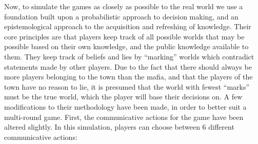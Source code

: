 Now, to simulate the games as closely as possible to the real world we use a 
foundation built upon a probabilistic approach to decision making, and an 
epistemological approach to the acquisition and refreshing of 
knowledge\cite{commitment}.
Their core principles are that players keep track of all possible worlds that
may be possible based on their own knowledge, and the public knowledge
available to them. They keep track of beliefs and lies by “marking” worlds
which contradict statements made by other players. Due to the fact that there
should always be more players belonging to the town than the mafia, and that
the players of the town have no reason to lie, it is presumed that the world
with fewest “marks” must be the true world, which the player will base their
decisions on. A few modifications to their methodology have been made, in order
to better suit a multi-round game. First, the communicative actions for the
game have been altered slightly. In this simulation, players can choose between
6 different communicative actions:

